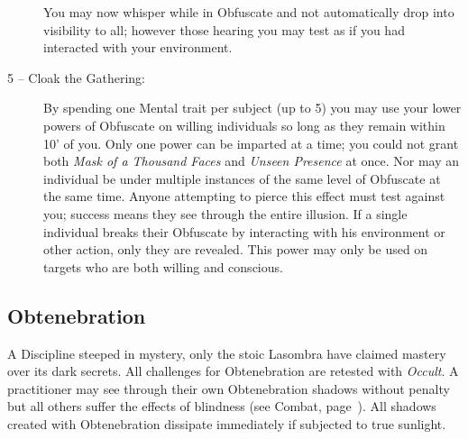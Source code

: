 \begin{description}
	You may now whisper while in Obfuscate and not automatically drop into visibility 
	to all; however those hearing you may test as if you had interacted with your environment.
	\item[5 -- Cloak the Gathering:]  By spending one Mental trait per subject (up to 5) you may use your 
	lower powers of Obfuscate on willing individuals so long as they remain within 10' of you.  Only one 
	power can be imparted at a time; you could not grant both \emph{Mask of a Thousand Faces} and 
	\emph{Unseen Presence} at once.  Nor may an individual be under multiple instances of the same 
	level of Obfuscate at the same time.  Anyone attempting to pierce this effect must test against you; 
	success means they see through the entire illusion.  If a single individual breaks their Obfuscate by 
	interacting with his environment or other action, only they are revealed.  This power may only be used 
	on targets who are both willing and conscious.
\end{description}

\subsection{Obtenebration}
A Discipline steeped in mystery, only the stoic Lasombra have claimed mastery over its dark secrets.  
All challenges for Obtenebration are retested with \emph{Occult}.  A practitioner may see through 
their own Obtenebration shadows without penalty but all others suffer the effects of blindness 
(see Combat, page~\pageref{sec:combat}).  All shadows created with Obtenebration dissipate immediately 
if subjected to true sunlight.

